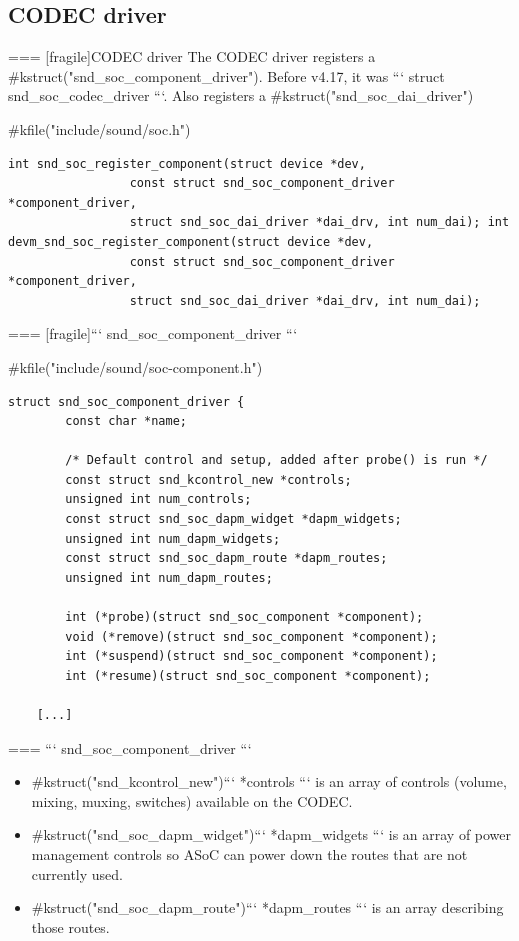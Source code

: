 
\subsection{CODEC driver}

=== [fragile]{CODEC driver}
  The CODEC driver registers a #kstruct("snd_soc_component_driver").
  Before v4.17, it was ``` struct snd_soc_codec_driver ```.
  Also registers a #kstruct("snd_soc_dai_driver")

  \begin{block}{#kfile("include/sound/soc.h")}
    \fontsize{9}{9}\selectfont
    \begin{verbatim}
int snd_soc_register_component(struct device *dev,
                 const struct snd_soc_component_driver *component_driver,
                 struct snd_soc_dai_driver *dai_drv, int num_dai); int devm_snd_soc_register_component(struct device *dev,
                 const struct snd_soc_component_driver *component_driver,
                 struct snd_soc_dai_driver *dai_drv, int num_dai);
    \end{verbatim}
  \end{block}


=== [fragile]{``` snd_soc_component_driver ```}
  \begin{block}{#kfile("include/sound/soc-component.h")}
    \fontsize{9}{9}\selectfont
    \begin{verbatim}
struct snd_soc_component_driver {
        const char *name;

        /* Default control and setup, added after probe() is run */
        const struct snd_kcontrol_new *controls;
        unsigned int num_controls;
        const struct snd_soc_dapm_widget *dapm_widgets;
        unsigned int num_dapm_widgets;
        const struct snd_soc_dapm_route *dapm_routes;
        unsigned int num_dapm_routes;

        int (*probe)(struct snd_soc_component *component);
        void (*remove)(struct snd_soc_component *component);
        int (*suspend)(struct snd_soc_component *component);
        int (*resume)(struct snd_soc_component *component);

    [...]
    \end{verbatim}
  \end{block}


=== {``` snd_soc_component_driver ```}
  \begin{itemize}
  \item #kstruct("snd_kcontrol_new")```  *controls ``` is an array of
    controls (volume, mixing, muxing, switches) available on the
    CODEC.
  \item #kstruct("snd_soc_dapm_widget")```  *dapm_widgets ``` is an array of
    power management controls so ASoC can power down the routes that
    are not currently used.
  \item #kstruct("snd_soc_dapm_route")```  *dapm_routes ``` is an array
    describing those routes.
  \end{itemize}


